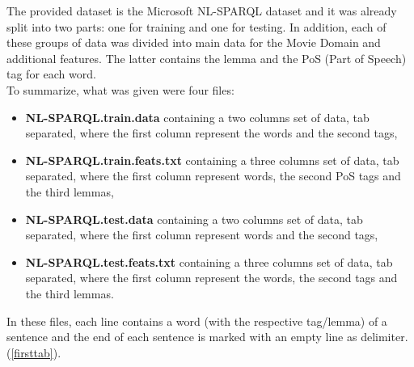 \documentclass[11pt,a4paper]{article}
\begin{document}
The provided dataset is the Microsoft NL-SPARQL dataset and it was already split into two parts: one for training and one for testing. In addition, each of these groups of data was divided into main data for the Movie Domain and additional features. The latter contains the lemma and the PoS (Part of Speech) tag for each word.\\ 
To summarize, what was given were four files:
\begin{itemize}
	\item \textbf{NL-SPARQL.train.data} containing a two columns set of data, tab separated, where the first column represent the words and the second tags,
	\item \textbf{NL-SPARQL.train.feats.txt} containing a three columns set of data, tab separated, where the first column represent words, the second PoS tags and the third lemmas,
	\item \textbf{NL-SPARQL.test.data} containing a two columns set of data, tab separated, where the first column represent words and the second tags,
	\item \textbf{NL-SPARQL.test.feats.txt} containing a three columns set of data, tab separated, where the first column represent the words, the second tags and the third lemmas.
\end{itemize}

In these files, each line contains a word (with the respective tag/lemma) of a sentence and the end of each sentence is marked with an empty line as delimiter. (\ref{firsttab}).\\
\end{document}
